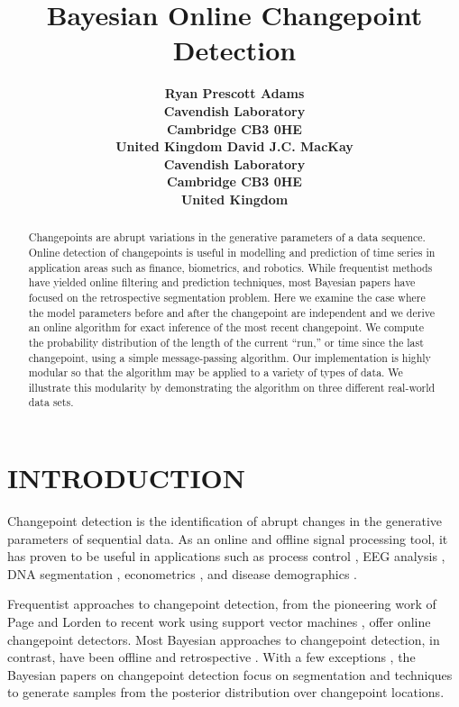 \documentclass[]{article}
\title{Bayesian Online Changepoint Detection}
\author{
  \bf{Ryan Prescott Adams}\\
  Cavendish Laboratory\\
  Cambridge CB3 0HE\\
  United Kingdom
  \And
  \bf{David J.C. MacKay}\\
  Cavendish Laboratory\\
  Cambridge CB3 0HE\\
  United Kingdom
}
\begin{document}
  \maketitle

  \begin{abstract}
    Changepoints are abrupt variations in the generative parameters of a
    data sequence.  Online detection of changepoints is useful in modelling
    and prediction of time series in application areas such as finance,
    biometrics, and robotics.  While frequentist methods have yielded
    online filtering and prediction techniques, most Bayesian papers have
    focused on the retrospective segmentation problem.  Here we examine the
    case where the model parameters before and after the changepoint are
    independent and we derive an online algorithm for exact inference of
    the most recent changepoint.  We compute the probability distribution
    of the length of the current ``run,'' or time since the last
    changepoint, using a simple message-passing algorithm.  Our
    implementation is highly modular so that the algorithm may be applied
    to a variety of types of data.  We illustrate this modularity by
    demonstrating the algorithm on three different real-world data sets.
  \end{abstract}

  \section{INTRODUCTION}
    Changepoint detection is the identification of abrupt changes in the
    generative parameters of sequential data.  As an online and offline
    signal processing tool, it has proven to be useful in applications such
    as process control \cite{aroian-levene-1950a}, EEG analysis
    \cite{bodenstein-praetorius-1977a, barlow-etal-1981a,
    kaplan-shishkin-2000a}, DNA segmentation \cite{braun-etal-2000a},
    econometrics \cite{chen-gupta-1997a, koop-potter-2004a}, and disease
    demographics \cite{denison-holmes-1999a}.

    Frequentist approaches to changepoint detection, from the pioneering
    work of Page \cite{page-1954a, page-1955a} and Lorden
    \cite{lorden-1971a} to recent work using support vector machines
    \cite{desobry-etal-2005a}, offer online changepoint detectors.  Most
    Bayesian approaches to changepoint detection, in contrast, have been
    offline and retrospective \cite{smith-1975a, barry-hartigan-1993a,
    stephens-1994a, green-1995a, chib-1998a}.  With a few exceptions
    \cite{jervis-jardine-1997a, oruanaidh-etal-1994a}, the Bayesian papers
    on changepoint detection focus on segmentation and techniques to
    generate samples from the posterior distribution over changepoint
    locations.
\end{document}
